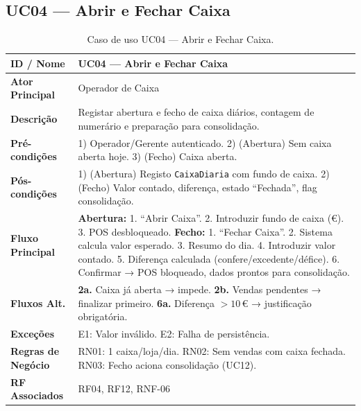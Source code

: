 \documentclass[a4paper,12pt]{scrreprt}
\begin{document}
\subsection*{UC04 --- Abrir e Fechar Caixa}
\begin{table}[H]
\centering\small
\begin{tabular}{|p{3cm}|p{11cm}|}
\hline
\textbf{ID / Nome} & UC04 --- Abrir e Fechar Caixa \\
\hline
\textbf{Ator Principal} & Operador de Caixa \\
\hline
\textbf{Descrição} & Registar abertura e fecho de caixa diários, contagem de numerário e preparação para consolidação. \\
\hline
\textbf{Pré-condições} & 1) Operador/Gerente autenticado. 2) (Abertura) Sem caixa aberta hoje. 3) (Fecho) Caixa aberta. \\
\hline
\textbf{Pós-condições} & 1) (Abertura) Registo \texttt{CaixaDiaria} com fundo de caixa. 2) (Fecho) Valor contado, diferença, estado ``Fechada'', flag consolidação. \\
\hline
\textbf{Fluxo Principal} & \textbf{Abertura:} 1. ``Abrir Caixa''. 2. Introduzir fundo de caixa (€). 3. POS desbloqueado. \textbf{Fecho:} 1. ``Fechar Caixa''. 2. Sistema calcula valor esperado. 3. Resumo do dia. 4. Introduzir valor contado. 5. Diferença calculada (confere/excedente/défice). 6. Confirmar → POS bloqueado, dados prontos para consolidação. \\
\hline
\textbf{Fluxos Alt.} & \textbf{2a.} Caixa já aberta → impede. \textbf{2b.} Vendas pendentes → finalizar primeiro. \textbf{6a.} Diferença $> 10$\,€ → justificação obrigatória. \\
\hline
\textbf{Exceções} & E1: Valor inválido. E2: Falha de persistência. \\
\hline
\textbf{Regras de Negócio} & RN01: 1 caixa/loja/dia. RN02: Sem vendas com caixa fechada. RN03: Fecho aciona consolidação (UC12). \\
\hline
\textbf{RF Associados} & RF04, RF12, RNF-06 \\
\hline
\end{tabular}
\caption{Caso de uso UC04 --- Abrir e Fechar Caixa.}
\end{table}

\end{document}
